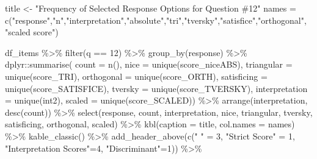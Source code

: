 \documentclass[
  letterpaper,
  DIV=11,
  numbers=noendperiod]{scrreprt}
\newenvironment{Shaded}{\begin{snugshade}}{\end{snugshade}}
\newcommand{\AttributeTok}[1]{\textcolor[rgb]{0.40,0.45,0.13}{#1}}
\newcommand{\DecValTok}[1]{\textcolor[rgb]{0.68,0.00,0.00}{#1}}
\newcommand{\FunctionTok}[1]{\textcolor[rgb]{0.28,0.35,0.67}{#1}}
\newcommand{\NormalTok}[1]{\textcolor[rgb]{0.00,0.23,0.31}{#1}}
\newcommand{\OtherTok}[1]{\textcolor[rgb]{0.00,0.23,0.31}{#1}}
\newcommand{\SpecialCharTok}[1]{\textcolor[rgb]{0.37,0.37,0.37}{#1}}
\newcommand{\StringTok}[1]{\textcolor[rgb]{0.13,0.47,0.30}{#1}}
\begin{document}
\begin{Shaded}
\begin{Highlighting}[]
\NormalTok{title }\OtherTok{\textless{}{-}} \StringTok{"Frequency of Selected Response Options for Question \#12"}
\NormalTok{names }\OtherTok{=} \FunctionTok{c}\NormalTok{(}\StringTok{"response"}\NormalTok{,}\StringTok{"n"}\NormalTok{,}\StringTok{"interpretation"}\NormalTok{,}\StringTok{"absolute"}\NormalTok{,}\StringTok{"tri"}\NormalTok{,}\StringTok{"tversky"}\NormalTok{,}\StringTok{"satisfice"}\NormalTok{,}\StringTok{"orthogonal"}\NormalTok{, }\StringTok{"scaled score"}\NormalTok{)}

\NormalTok{df\_items }\SpecialCharTok{\%\textgreater{}\%} \FunctionTok{filter}\NormalTok{(q }\SpecialCharTok{==} \DecValTok{12}\NormalTok{) }\SpecialCharTok{\%\textgreater{}\%} \FunctionTok{group\_by}\NormalTok{(response) }\SpecialCharTok{\%\textgreater{}\%}
\NormalTok{  dplyr}\SpecialCharTok{::}\FunctionTok{summarise}\NormalTok{( }\AttributeTok{count =} \FunctionTok{n}\NormalTok{(),}
                    \AttributeTok{nice =} \FunctionTok{unique}\NormalTok{(score\_niceABS),}
                    \AttributeTok{triangular =} \FunctionTok{unique}\NormalTok{(score\_TRI),}
                    \AttributeTok{orthogonal =}  \FunctionTok{unique}\NormalTok{(score\_ORTH),}
                    \AttributeTok{satisficing =}  \FunctionTok{unique}\NormalTok{(score\_SATISFICE),}
                    \AttributeTok{tversky =} \FunctionTok{unique}\NormalTok{(score\_TVERSKY),}
                    \AttributeTok{interpretation =} \FunctionTok{unique}\NormalTok{(int2),}
                    \AttributeTok{scaled =} \FunctionTok{unique}\NormalTok{(score\_SCALED)) }\SpecialCharTok{\%\textgreater{}\%}
  \FunctionTok{arrange}\NormalTok{(interpretation, }\FunctionTok{desc}\NormalTok{(count)) }\SpecialCharTok{\%\textgreater{}\%}
  \FunctionTok{select}\NormalTok{(response, count, interpretation, nice,}
\NormalTok{         triangular, tversky, satisficing, orthogonal, scaled) }\SpecialCharTok{\%\textgreater{}\%}
  \FunctionTok{kbl}\NormalTok{(}\AttributeTok{caption =}\NormalTok{ title, }\AttributeTok{col.names =}\NormalTok{ names) }\SpecialCharTok{\%\textgreater{}\%}  \FunctionTok{kable\_classic}\NormalTok{() }\SpecialCharTok{\%\textgreater{}\%}
  \FunctionTok{add\_header\_above}\NormalTok{(}\FunctionTok{c}\NormalTok{(}\StringTok{" "} \OtherTok{=} \DecValTok{3}\NormalTok{, }\StringTok{"Strict Score"} \OtherTok{=} \DecValTok{1}\NormalTok{, }\StringTok{"Interpretation Scores"}\OtherTok{=}\DecValTok{4}\NormalTok{, }\StringTok{"Discriminant"}\OtherTok{=}\DecValTok{1}\NormalTok{)) }\SpecialCharTok{\%\textgreater{}\%}

\end{Highlighting}
\end{Shaded}
\end{document}
